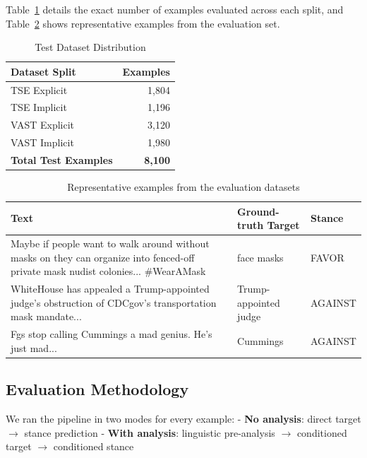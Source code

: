 \documentclass[conference]{IEEEtran}
\begin{document}
Table~\ref{tab:test_distribution} details the exact number of examples evaluated across each split, and Table~\ref{tab:test_samples} shows representative examples from the evaluation set.

\begin{table}[htbp]
\centering
\caption{Test Dataset Distribution}
\label{tab:test_distribution}
\small
\begin{tabular}{l r}
\toprule
\textbf{Dataset Split} & \textbf{Examples} \\
\midrule
TSE Explicit & 1,804 \\
TSE Implicit & 1,196 \\
VAST Explicit & 3,120 \\
VAST Implicit & 1,980 \\
\midrule
\textbf{Total Test Examples} & \textbf{8,100} \\
\bottomrule
\end{tabular}
\end{table}

\begin{table}[!htbp]
\centering
\caption{Representative examples from the evaluation datasets}
\label{tab:test_samples}
\small
\begin{tabular}{|p{}|p{}|p{}|}
\hline
\textbf{Text} & \textbf{Ground-truth Target} & \textbf{Stance} \\
\hline
Maybe if people want to walk around without masks on they can organize into fenced-off private mask nudist colonies... \#WearAMask & face masks & FAVOR \\
\hline
WhiteHouse has appealed a Trump-appointed judge's obstruction of CDCgov's transportation mask mandate... & Trump-appointed judge & AGAINST \\
\hline
Fgs stop calling Cummings a mad genius. He's just mad... & Cummings & AGAINST \\
\hline
\end{tabular}
\end{table}

\subsection{Evaluation Methodology}

We ran the pipeline in two modes for every example:
- \textbf{No analysis}: direct target $\to$ stance prediction
- \textbf{With analysis}: linguistic pre-analysis $\to$ conditioned target $\to$ conditioned stance
\end{document}
